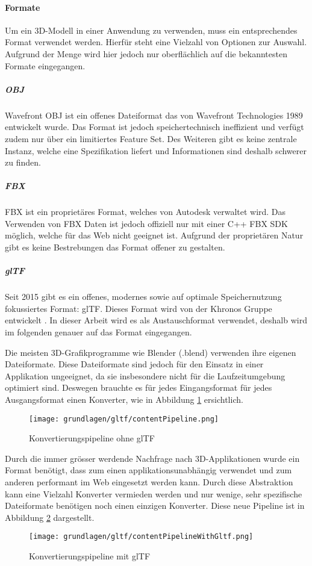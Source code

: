 \paragraph{Formate}
Um ein 3D-Modell in einer Anwendung zu verwenden, muss ein entsprechendes Format verwendet werden. Hierfür steht eine Vielzahl von Optionen zur Auswahl. Aufgrund der Menge wird hier jedoch nur oberflächlich auf die bekanntesten Formate eingegangen.

\subparagraph{OBJ}
Wavefront OBJ ist ein offenes Dateiformat das von Wavefront Technologies 1989 entwickelt wurde. Das Format ist jedoch speichertechnisch ineffizient und verfügt zudem nur über ein limitiertes Feature Set. Des Weiteren gibt es keine zentrale Instanz, welche eine Spezifikation liefert und Informationen sind deshalb schwerer zu finden. \cite{objSpec}

\subparagraph{FBX}
FBX ist ein proprietäres Format, welches von Autodesk verwaltet wird. Das Verwenden von FBX Daten ist jedoch offiziell nur mit einer C++ FBX SDK möglich, welche für das Web nicht geeignet ist. Aufgrund der proprietären Natur gibt es keine Bestrebungen das Format offener zu gestalten.

\subparagraph{glTF}
Seit 2015 gibt es ein offenes, modernes sowie auf optimale Speichernutzung fokussiertes Format: glTF. Dieses Format wird von der Khronos Gruppe entwickelt \cite{gltf1Spec}. In dieser Arbeit wird es als Austauschformat verwendet, deshalb wird im folgenden genauer auf das Format eingegangen.

Die meisten 3D-Grafikprogramme wie Blender (.blend) verwenden ihre eigenen Dateiformate. Diese Dateiformate sind jedoch für den Einsatz in einer Applikation ungeeignet, da sie insbesondere nicht für die Laufzeitumgebung optimiert sind. Deswegen brauchte es für jedes Eingangsformat für jedes Ausgangsformat einen Konverter, wie in Abbildung \ref{fig:contentPipelineWithoutGltf} ersichtlich.

\begin{figure}[H]
  \centering
  \texttt{[image: grundlagen/gltf/contentPipeline.png]}
  \caption{Konvertierungspipeline ohne glTF \cite{gltfTutorialIntro}}
  \label{fig:contentPipelineWithoutGltf}
\end{figure}

Durch die immer grösser werdende Nachfrage nach 3D-Applikationen wurde ein Format benötigt, dass zum einen applikationsunabhängig verwendet und zum anderen performant im Web eingesetzt werden kann.
Durch diese Abstraktion kann eine Vielzahl Konverter vermieden werden und nur wenige, sehr spezifische Dateiformate benötigen noch einen einzigen Konverter. Diese neue Pipeline ist in Abbildung \ref{fig:contentPipelineWithGltf} dargestellt. \cite{gltfTutorialIntro}
\begin{figure}[H]
  \centering
  \texttt{[image: grundlagen/gltf/contentPipelineWithGltf.png]}
  \caption{Konvertierungspipeline mit glTF \cite{gltfTutorialIntro}}
  \label{fig:contentPipelineWithGltf}
\end{figure}

